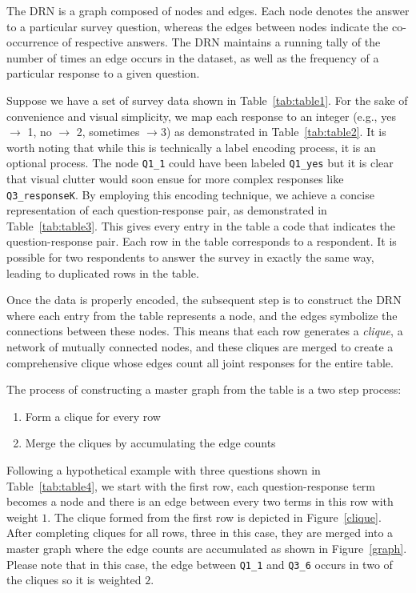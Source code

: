 The DRN is a graph composed of nodes and edges. Each node denotes the answer to a particular survey question, whereas the edges between nodes indicate the co-occurrence of respective answers.  The DRN maintains a running tally of the number of times an edge occurs in the dataset, as well as the frequency of a particular response to a given question.

Suppose we have a set of survey data shown in  Table~\ref{tab:table1}. For the sake of convenience and visual simplicity, we map each response to an integer (e.g., yes $\to$ 1, no $\to$ 2, sometimes $\rightarrow 3$) as demonstrated in Table~\ref{tab:table2}. It is worth noting that while this is technically a label encoding process, it is an optional process. The node \texttt{Q1\_1} could have been labeled \texttt{Q1\_yes} but it is clear that visual clutter would soon ensue for more complex responses like \texttt{Q3\_responseK}. By employing this encoding technique, we achieve a concise representation of each question-response pair, as demonstrated in Table~\ref{tab:table3}. This gives every entry in the table a code that indicates the question-response pair. Each row in the table corresponds to a respondent. It is possible for two respondents to answer the survey in exactly the same way, leading to duplicated rows in the table. 

Once the data is properly encoded, the subsequent step is to construct the DRN where each entry from the table represents a node, and the edges symbolize the connections between these nodes. This means that each row generates a \textit{clique}, a network of mutually connected nodes, and these cliques are merged to create a comprehensive clique whose edges count all joint responses for the entire table. 

The process of constructing a master graph from the table is a two step process:
\begin{enumerate}
    \renewcommand{\labelenumi}{(\roman{enumi})}
    \item Form a clique for every row
    \item Merge the cliques by accumulating the edge counts
\end{enumerate}
\noindent Following a hypothetical example with three questions shown in Table~\ref{tab:table4}, we start with the first row, each question-response term becomes a node and there is an edge between every two terms in this row with weight $1$. The clique formed from the first row is depicted in Figure~\ref{clique}. After completing cliques for all rows, three in this case, they are merged into a master graph where the edge counts are accumulated as shown in Figure~\ref{graph}. Please note that in this case, the edge between \texttt{Q1\_1} and \texttt{Q3\_6} occurs in two of the cliques so it is weighted $2$.

